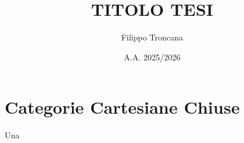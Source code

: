 \documentclass{book}
\title{TITOLO TESI}
\author{Filippo Troncana}
\date{A.A. 2025/2026}
\begin{document}
\chapter{Categorie Cartesiane Chiuse}

Una 
\end{document}
